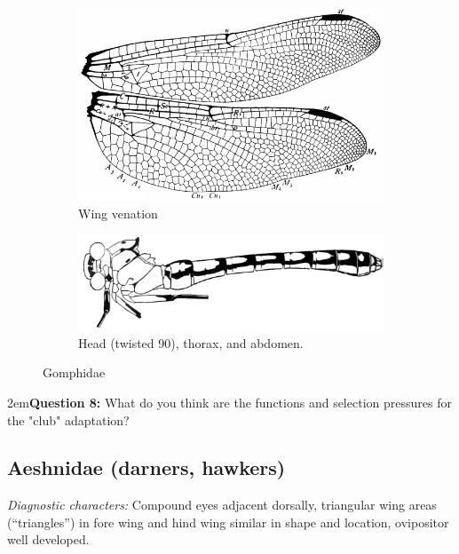 \documentclass[letterpaper, 11pt]{article}
\begin{document}
\begin{figure}[ht!]
    \centering
    \begin{subfigure}[ht!]{0.4\textwidth}
        \includegraphics[width=\textwidth]{GomphidaeWing}
        \caption{Wing venation \citep[][Fig. 229]{comstock1918wings}}
        \label{fig:gomphid1}
    \end{subfigure}
    \hfill
    \begin{subfigure}[ht!]{0.55\textwidth}
        \includegraphics[width=\textwidth]{gomphidBody.png}
        \caption{Head (twisted 90\textdegree), thorax, and abdomen. \citep[Modified from Fig. 4:17 f1 in][]{bhlitem126080usinger}}
        \label{fig:gomphid2}
    \end{subfigure}
    \caption{Gomphidae}\label{fig:gomphids}
\end{figure}

\hangindent2em\textbf{Question 8:} What do you think are the functions and selection pressures for the "club" adaptation?\\

\subsection{Aeshnidae (darners, hawkers)}
\noindent{}\textit{Diagnostic characters:} Compound eyes adjacent dorsally, triangular wing areas (``triangles'') in fore wing and hind wing similar in shape and location, ovipositor well developed.\\
\end{document}
